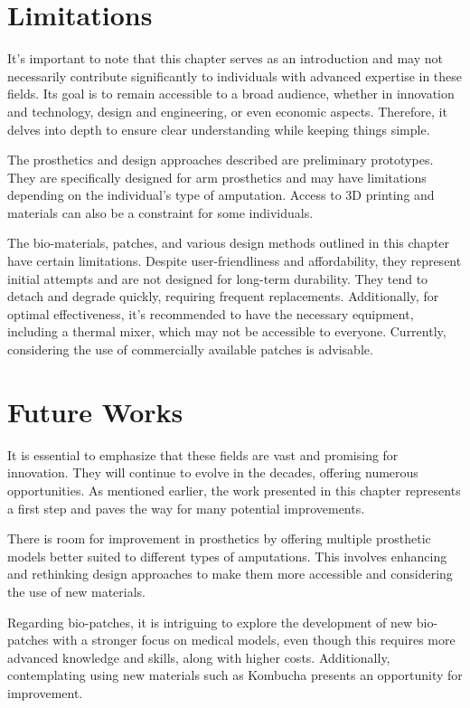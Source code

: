\section{Limitations}
It's important to note that this chapter serves as an introduction and may not necessarily contribute significantly to individuals with advanced expertise in these fields. Its goal is to remain accessible to a broad audience, whether in innovation and technology, design and engineering, or even economic aspects. Therefore, it delves into depth to ensure clear understanding while keeping things simple. 

The prosthetics and design approaches described are preliminary prototypes. They are specifically designed for arm prosthetics and may have limitations depending on the individual's type of amputation. Access to 3D printing and materials can also be a constraint for some individuals.

The bio-materials, patches, and various design methods outlined in this chapter have certain limitations. Despite user-friendliness and affordability, they represent initial attempts and are not designed for long-term durability. They tend to detach and degrade quickly, requiring frequent replacements. Additionally, for optimal effectiveness, it's recommended to have the necessary equipment, including a thermal mixer, which may not be accessible to everyone. Currently, considering the use of commercially available patches is advisable.

\section{Future Works}
It is essential to emphasize that these fields are vast and promising for innovation. They will continue to evolve in the decades, offering numerous opportunities. As mentioned earlier, the work presented in this chapter represents a first step and paves the way for many potential improvements.

There is room for improvement in prosthetics by offering multiple prosthetic models better suited to different types of amputations. This involves enhancing and rethinking design approaches to make them more accessible and considering the use of new materials.

Regarding bio-patches, it is intriguing to explore the development of new bio-patches with a stronger focus on medical models, even though this requires more advanced knowledge and skills, along with higher costs. Additionally, contemplating using new materials such as Kombucha presents an opportunity for improvement.

